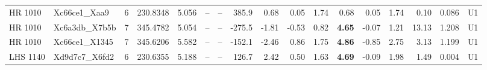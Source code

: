 \begin{tabular}{@{}l@{~}l@{~}c@{~}r@{~}r@{~}c@{~}l@{~}r@{~~}r@{~}r@{~}r@{~~}r@{~}r@{~}r@{~~}r@{~}r@{~}l@{}}
HR 1010 & Xc66ce1\_Xaa9 & 6 & 230.8348 & 5.056 & -- & -- & 385.9 & 0.68 & 0.05 & 1.74 & 0.68 & 0.05 & 1.74 & 0.10 & 0.086 & U1 \\
HR 1010 & Xc6a3db\_X7b5b & 7 & 345.4782 & 5.054 & -- & -- & -275.5 & -1.81 & -0.53 & 0.82 & \textbf{4.65} & -0.07 & 1.21 & 13.13 & 1.208 & U1 \\
HR 1010 & Xc66ce1\_X1345 & 7 & 345.6206 & 5.582 & -- & -- & -152.1 & -2.46 & 0.86 & 1.75 & \textbf{4.86} & -0.85 & 2.75 & 3.13 & 1.199 & U1 \\
LHS 1140 & Xd9d7c7\_X6fd2 & 6 & 230.6355 & 5.188 & -- & -- & 126.7 & 2.42 & 0.50 & 1.63 & \textbf{4.69} & -0.09 & 1.98 & 1.49 & 0.004 & U1 \\
\hline
\end{tabular}
